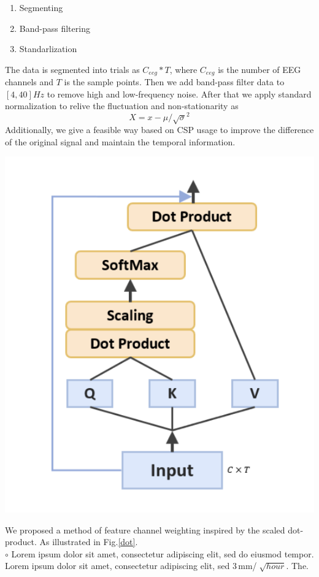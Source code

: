 \documentclass[a0,portrait]{a0poster}
\begin{document}
\begin{minipage}[c]{\linewidth}
\begin{framed}
\begin{multicols}{2}
\begin{enumerate}
\item Segmenting
\item Band-pass filtering
\item Standarlization
\end{enumerate}
The data is segmented into trials as $C_{eeg}*T$, where $C_{eeg}$ is the number of EEG channels and $T$ is the sample points. Then we add band-pass filter data to $[4,40]Hz$ to remove high and low-frequency noise. After that we apply standard normalization to relive the fluctuation and non-stationarity  as $$X={x-\mu}/{\sqrt{\sigma}^2}$$Additionally, we give a feasible way based on CSP usage to improve the difference of the original signal and maintain the temporal information.\\
\begin {center}
\includegraphics{figures/dot}
\label{dot}
\end{center}
We proposed a method of feature channel weighting inspired by the scaled dot-product. As illustrated in Fig.\ref{dot}. \\
\hspace{0.1cm}$\circ$ Lorem ipsum dolor sit amet, consectetur adipiscing elit, sed do eiusmod tempor.\\
Lorem ipsum dolor sit amet, consectetur adipiscing elit, sed  3\,mm/$\sqrt[]{hour}$. The.
\color{Black}

\end{multicols}
\end{framed}
\end{minipage}
\end{document}
